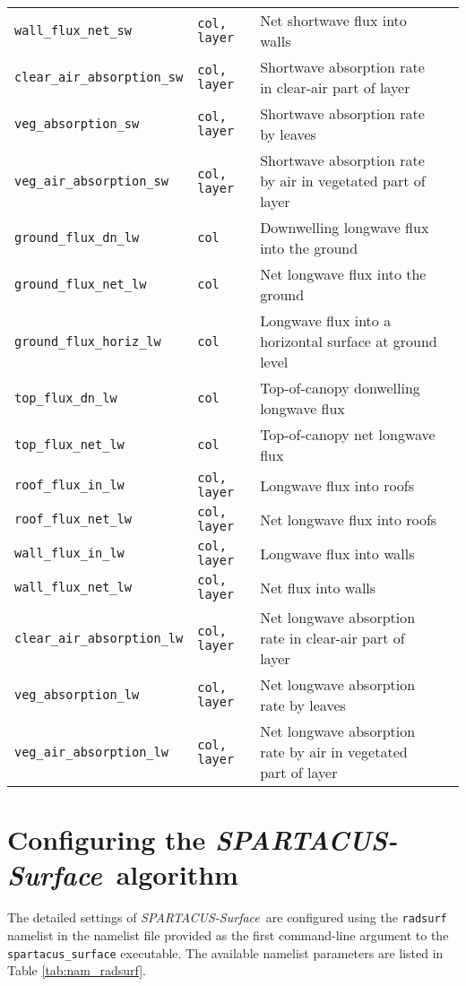 \documentclass[a4,oneside]{article}
\def\codesize{\small}
\def\codetabsize{\footnotesize}
\def\spsurf{\emph{SPARTACUS-Surface}}
\def\code#1{{\codesize\texttt{#1}}}
\def\codetab#1{{\codetabsize\texttt{#1}}}
\begin{document}
\begin{center}
\begin{longtable}{llLp{7cm}}
\codetab{wall\_flux\_net\_sw} & \codetab{col, layer} & Net shortwave flux into walls\\
\codetab{clear\_air\_absorption\_sw} & \codetab{col, layer} & Shortwave absorption rate in clear-air part of layer\\
\codetab{veg\_absorption\_sw} & \codetab{col, layer} & Shortwave absorption rate by leaves\\
\codetab{veg\_air\_absorption\_sw} & \codetab{col, layer} & Shortwave absorption rate by air in vegetated part of layer\\
\codetab{ground\_flux\_dn\_lw} & \codetab{col} & Downwelling longwave flux into the ground\\
\codetab{ground\_flux\_net\_lw} & \codetab{col} & Net longwave flux into the ground\\
\codetab{ground\_flux\_horiz\_lw} & \codetab{col} & Longwave flux into a horizontal surface at ground level\\
\codetab{top\_flux\_dn\_lw} & \codetab{col} & Top-of-canopy donwelling longwave flux\\
\codetab{top\_flux\_net\_lw} & \codetab{col} & Top-of-canopy net longwave flux\\
\codetab{roof\_flux\_in\_lw} & \codetab{col, layer} & Longwave flux into roofs\\
\codetab{roof\_flux\_net\_lw} & \codetab{col, layer} & Net longwave flux into roofs\\
\codetab{wall\_flux\_in\_lw} & \codetab{col, layer} & Longwave flux into walls\\
\codetab{wall\_flux\_net\_lw} & \codetab{col, layer} & Net flux into walls\\
\codetab{clear\_air\_absorption\_lw} & \codetab{col, layer} & Net longwave absorption rate in clear-air part of layer\\
\codetab{veg\_absorption\_lw} & \codetab{col, layer} & Net longwave absorption rate by leaves\\
\codetab{veg\_air\_absorption\_lw} & \codetab{col, layer} & Net longwave absorption rate by air in vegetated part of layer\\
\hline
\end{longtable}
\end{center}


\section{Configuring the \spsurf\ algorithm}
\label{sec:nam_radsurf}
The detailed settings of \spsurf\ are configured using the
\code{radsurf} namelist in the namelist file provided as the first
command-line argument to the \code{spartacus\_surface} executable. The
available namelist parameters are listed in Table
\ref{tab:nam_radsurf}.
\end{document}
